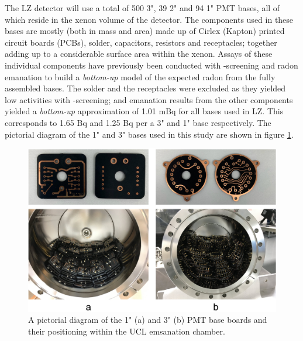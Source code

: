 The LZ detector will use a total of 500 3", 39 2" and 94 1" PMT bases, all of which reside in the xenon volume of the detector. The components used in these bases are mostly (both in mass and area) made up of Cirlex (Kapton) printed circuit boards (PCBs), solder, capacitors, resistors and receptacles; together adding up to a considerable surface area within the xenon. Assays of these individual components have previously been conducted with \gamma{}-screening and radon emanation to build a \textit{bottom-up} model of the expected radon from the fully assembled bases. The solder and the receptacles were excluded as they yielded low \UTTEe{} activities with \gamma-screening; and emanation results from the other components yielded a \textit{bottom-up} approximation of 1.01 mBq for all bases used in LZ. This corresponds to 1.65 \micro{}Bq and 1.25 \micro{}Bq per a 3" and 1" base respectively. The pictorial diagram of the 1" and 3" bases used in this study are shown in figure \ref{fig:1_and_3_inch_bases}.
%
\begin{figure}[b]
    \centering
    \includegraphics[scale=0.2]{Chapter_4/Figures/ucl_measurements/pmt_bases.jpg}
    \caption[A pictorial diagram of the 1" (a) and 3" (b) PMT base boards and their positioning within the UCL emsanation chamber.]
    {A pictorial diagram of the 1" (a) and 3" (b) PMT base boards and their positioning within the UCL emsanation chamber.}
    \label{fig:1_and_3_inch_bases}
\end{figure}
%
%

%

